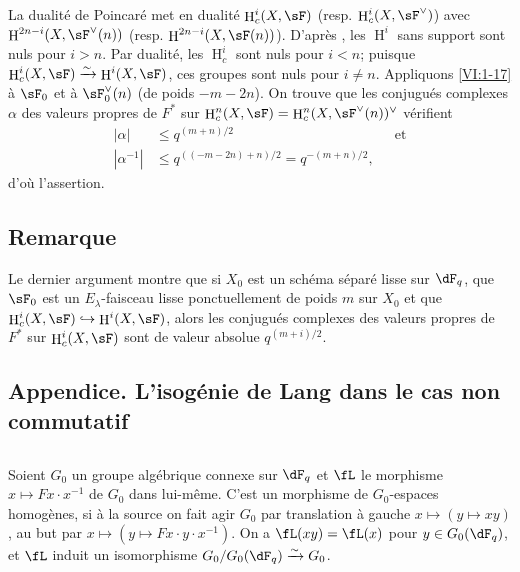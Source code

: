 \documentclass[oneside]{book}
\DeclareMathOperator{\h}{H}
\newcommand{\iso}{\xrightarrow\sim}
\theoremstyle{sga-source}
\theoremstyle{sga-source-dash}
\theoremstyle{sga-source-dotdash}
\theoremstyle{sga-source-number-note-dash}
\theoremstyle{sga-source-note-number-dotdash}
\theoremstyle{sga-source-example-dotdash}
\theoremstyle{sga-source-inline-number}
\theoremstyle{sga-source-bare-number}
\theoremstyle{sga-source}
\newcommand{\PrintPage}[1]{}\newcommand{\MathPage}[1]{}\newcommand{\PrintCite}[2]{#1}\newcommand{\var}[3]{#2}
\begin{document}
La dualité de Poincaré met en dualité $\h_c^i(X,\sF)$ (resp. 
$\h_c^i(X,\sF^\vee)$) avec $\h^{2n-i}(X,\sF^\vee(n))$ (resp. 
$\h^{2n-i}(X,\sF(n))$). D'après \cite[XIV 3.2]{sga4}, les $\h^i$ sans support 
sont nuls pour $i>n$. Par dualité, les $\h_c^i$ sont nuls pour $i<n$; puisque 
$\h_c^i(X,\sF) \iso \h^i(X,\sF)$, ces groupes sont nuls pour $i\ne n$. 
\var{Appliquons \ref{VI:1-15}}{Appliquons \ref{VI:1-17}}{S45-SOL-0722} à $\sF_0$ et à $\sF_0^\vee(n)$ (de poids 
$-m-2n$). On trouve que les conjugués complexes $\alpha$ des valeurs propres 
de $F^\ast$ sur $\h_c^n(X,\sF) = \h_c^n(X,\sF^\vee(n))^\vee$ vérifient 
\begin{align*}
  |\alpha| &\leqslant q^{(m+n)/2} && \text{et} \\
  |\alpha^{-1}| &\leqslant q^{((-m-2n)+n)/2} = q^{-(m+n)/2} \text{,}
\end{align*}
d'où l'assertion. 





\subsection{Remarque}\label{VI:1-21}

Le dernier argument montre que si $X_0$ est un schéma séparé lisse sur 
$\dF_q$, que $\sF_0$ est un $E_\lambda$-faisceau lisse ponctuellement de poids 
$m$ sur $X_0$ et que $\h_c^i(X,\sF) \hookrightarrow \h^i(X,\sF)$, alors les 
conjugués complexes des valeurs propres de $F^\ast$ sur $\h_c^i(X,\sF)$ sont 
de valeur absolue $q^{(m+i)/2}$. 





\PrintPage{181}
\subsection*{Appendice. L'isogénie de Lang dans le cas non commutatif}




\subsection{}\label{VI:1-22}

Soient $G_0$ un groupe algébrique connexe sur $\dF_q$ et $\fL$ le morphisme 
$x\mapsto F x\cdot x^{-1}$ de $G_0$ dans lui-même. C'est un morphisme de 
$G_0$-espaces homogènes, si à la source on fait agir $G_0$ par translation 
à gauche $x\mapsto (y\mapsto x y)$, au but par 
$x\mapsto (y\mapsto F x\cdot y\cdot x^{-1})$. On a $\fL(xy) = \fL(x)$ pour 
$y\in G_0(\dF_q)$, et $\fL$ induit un isomorphisme $G_0/G_0(\dF_q)\iso G_0$. 
\end{document}
